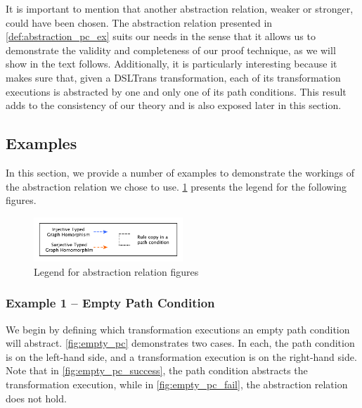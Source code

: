 
It is important to mention that another abstraction relation, weaker or
stronger, could have been chosen. The abstraction relation presented in
\cref{def:abstraction_pc_ex} suits our needs in the sense that it allows us to
demonstrate the validity and completeness of our proof technique, as we will
show in the text follows. Additionally, it is particularly interesting because
it makes sure that, given a DSLTrans transformation, each of its transformation
executions is abstracted by one and only one of its path conditions. This result
adds to the consistency of our theory and is also exposed later in this section.



\subsection{Examples}

In this section, we provide a number of examples to demonstrate the workings of
the abstraction relation we chose to use. \cref{fig:legend} presents the legend
for the following figures.

\begin{figure}[htb]
 \centering
                \includegraphics[width=0.5\textwidth]{./figures/abstraction_relation/legend.pdf}
                \caption{Legend for abstraction relation figures}
                \label{fig:legend}
\end{figure}
                
\subsubsection{Example 1 -- Empty Path Condition}

We begin by defining which transformation executions an empty path condition
will abstract. \cref{fig:empty_pc} demonstrates two cases. In each, the path
condition is on the left-hand side, and a transformation execution is on the
right-hand side. Note that in \cref{fig:empty_pc_success}, the path condition
abstracts the transformation execution, while in \cref{fig:empty_pc_fail}, the
abstraction relation does not hold.

